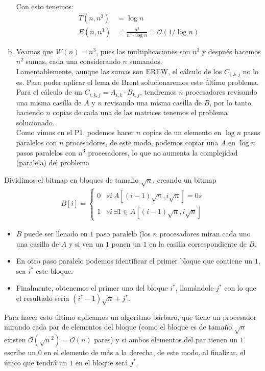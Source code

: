 \documentclass[dcc,uchile]{fcfmcourse}
\begin{document}
\begin{problems}
\begin{enumerate}[a)]
\begin{algorithm}[H]
\SetAlgoLined
{}
\end{algorithm}
Con esto tenemos:
\begin{align*}
T(n,n^3) &= \log{n}\\
E(n,n^3) &= \frac{n^3}{n^3\cdot \log{n}} = \mathcal{O}(1/\log{n})
\end{align*}
\item
Veamos que $W(n) = n^3$, pues las multiplicaciones son $n^3$ y después hacemos $n^2$ sumas, cada una considerando $n$ sumandos.\\
Lamentablemente, aunque las sumas son EREW, el cálculo de los $C_{i,k,j}$ no lo es. Para poder aplicar el lema de Brent solucionaremos este último problema.\\
Para el cálculo de un $C_{i,k,j} = A_{i,k}\cdot B_{k,j}$, tendremos $n$ procesadores revisando una misma casilla de $A$ y $n$ revisando una misma casilla de $B$, por lo tanto haciendo $n$ copias de cada una de las matrices tenemos el problema solucionado.\\
Como vimos en el P1, podemos hacer $n$ copias de un elemento en $\log{n}$ pasos paralelos con $n$ procesadores, de este modo, podemos copiar una $A$ en $\log{n}$ pasos paralelos con $n^3$ procesadores, lo que no aumenta la complejidad (paralela) del problema
\end{enumerate}
\problem
Dividimos el bitmap en bloques de tamaño $\sqrt{n}$, creando un bitmap
\begin{align*}
    B[i] = \begin{cases} 
      0 & si\ A[(i-1)\sqrt{n}, i\sqrt{n}] = 0s \\
      1 & si\ \exists 1 \in A[(i-1)\sqrt{n}, i\sqrt{n}] 
   \end{cases}
\end{align*}
\begin{itemize}
    \item $B$ puede ser llenado en $1$ paso paralelo (los $n$ procesadores miran cada uno una casilla de $A$ y si ven un $1$ ponen un $1$ en la casilla correspondiente de $B$.
    \item En otro paso paralelo podemos identificar el primer bloque que contiene un $1$, sea $i^*$ este bloque.
    \item Finalmente, obtenemos el primer uno del bloque $i^*$, llamándole $j^*$ con lo que el resultado sería $(i^*-1)\sqrt{n}+j^*$.
\end{itemize}
Para hacer esto último aplicamos un algoritmo bárbaro, que tiene un procesador mirando cada par de elementos del bloque (como el bloque es de tamaño $\sqrt{n}$ existen $\mathcal{O}(\sqrt{n}^2) = \mathcal{O}(n)$ pares) y si ambos elementos del par tienen un $1$ escribe un $0$ en el elemento de más a la derecha, de este modo, al finalizar, el único que tendrá un $1$ en el bloque será $j^*$.
\end{problems}
\end{document}
